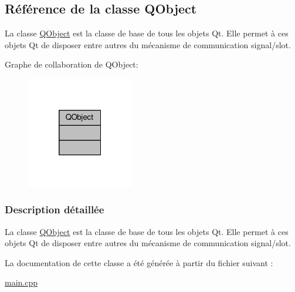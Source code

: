 \hypertarget{class_q_object}{}\subsection{Référence de la classe Q\+Object}
\label{class_q_object}


La classe \hyperlink{class_q_object}{Q\+Object} est la classe de base de tous les objets Qt. Elle permet à ces objets Qt de disposer entre autres du mécanisme de communication signal/slot.  




Graphe de collaboration de Q\+Object\+:\nopagebreak
\begin{figure}[H]
\begin{center}
\leavevmode
\includegraphics[width=133pt]{class_q_object__coll__graph}
\end{center}
\end{figure}


\subsubsection{Description détaillée}
La classe \hyperlink{class_q_object}{Q\+Object} est la classe de base de tous les objets Qt. Elle permet à ces objets Qt de disposer entre autres du mécanisme de communication signal/slot. 

La documentation de cette classe a été générée à partir du fichier suivant \+:\begin{DoxyCompactItemize}
\item 
\hyperlink{main_8cpp}{main.\+cpp}\end{DoxyCompactItemize}
